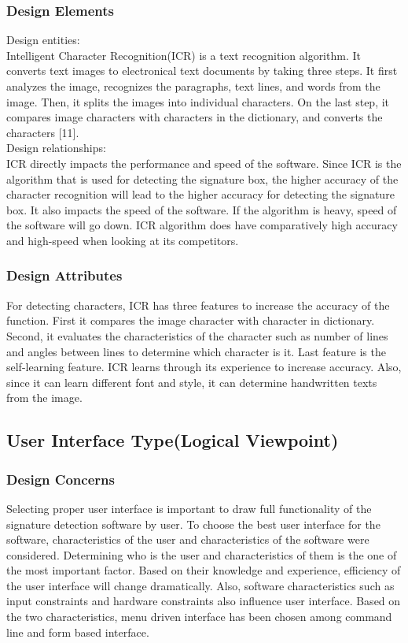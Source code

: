 \documentclass[onecolumn, draftclsnofoot,10pt, compsoc]{IEEEtran}
\begin{document}
\subsubsection{Design Elements}
Design entities: \\
Intelligent Character Recognition(ICR) is a text recognition algorithm. It converts text images to electronical text documents by taking three steps. It first analyzes the image, recognizes the paragraphs, text lines, and words from the image. Then, it splits the images into individual characters. On the last step, it compares image characters with characters in the dictionary, and converts the characters [11].  \\

Design relationships:\\
ICR directly impacts the performance and speed of the software. Since ICR is the algorithm that is used for detecting the signature box, the higher accuracy of the character recognition will lead to the higher accuracy for detecting the signature box. It also impacts the speed of the software. If the algorithm is heavy, speed of the software will go down. ICR algorithm does have comparatively high accuracy and high-speed when looking at its competitors.\\

\subsubsection{Design Attributes}
For detecting characters, ICR has three features to increase the accuracy of the function. First it compares the image character with character in dictionary. Second, it evaluates the characteristics of the character such as number of lines and angles between lines to determine which character is it. Last feature is the self-learning feature. ICR learns through its experience to increase accuracy. Also, since it can learn different font and style, it can determine handwritten texts from the image.


\subsection{User Interface Type(Logical Viewpoint)}
\subsubsection{Design Concerns}
Selecting proper user interface is important to draw full functionality of the signature detection software by user. To choose the best user interface for the software, characteristics of the user and characteristics of the software were considered. Determining who is the user and characteristics of them is the one of the most important factor. Based on their knowledge and experience, efficiency of the user interface will change dramatically. Also, software characteristics such as input constraints and hardware constraints also influence user interface. Based on the two characteristics, menu driven interface has been chosen among command line and form based interface. 
\end{document}
